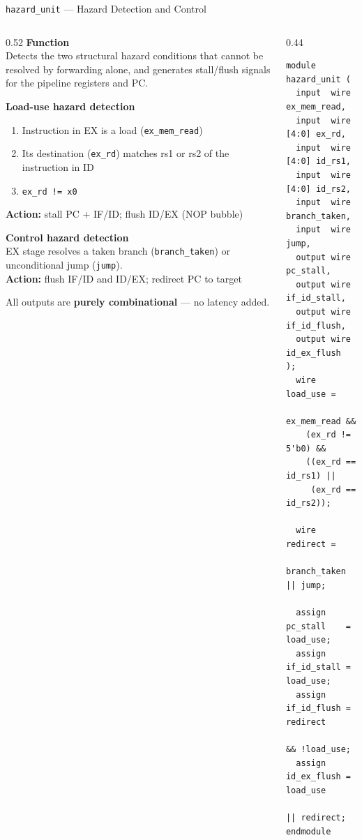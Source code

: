 \documentclass[aspectratio=169,10pt]{beamer}
\begin{document}
\begin{frame}[fragile]{\texttt{hazard\_unit} --- Hazard Detection and Control}
  \begin{columns}[T]
    \begin{column}{0.52\textwidth}
      \textbf{Function}\\
      Detects the two structural hazard conditions that cannot be resolved by forwarding alone, and generates stall/flush signals for the pipeline registers and PC.

      \vspace{0.5em}
      \textbf{Load-use hazard detection}
      \begin{enumerate}\small
        \item Instruction in EX is a load (\texttt{ex\_mem\_read})
        \item Its destination (\texttt{ex\_rd}) matches rs1 or rs2 of the instruction in ID
        \item \texttt{ex\_rd != x0}
      \end{enumerate}
      \textbf{Action:} stall PC + IF/ID; flush ID/EX (NOP bubble)

      \vspace{0.5em}
      \textbf{Control hazard detection}\\
      EX stage resolves a taken branch (\texttt{branch\_taken}) or unconditional jump (\texttt{jump}).\\
      \textbf{Action:} flush IF/ID and ID/EX; redirect PC to target

      \vspace{0.5em}
      \small All outputs are \textbf{purely combinational} --- no latency added.
    \end{column}
    \begin{column}{0.44\textwidth}
\begin{lstlisting}
module hazard_unit (
  input  wire       ex_mem_read,
  input  wire [4:0] ex_rd,
  input  wire [4:0] id_rs1,
  input  wire [4:0] id_rs2,
  input  wire       branch_taken,
  input  wire       jump,
  output wire       pc_stall,
  output wire       if_id_stall,
  output wire       if_id_flush,
  output wire       id_ex_flush
);
  wire load_use =
    ex_mem_read &&
    (ex_rd != 5'b0) &&
    ((ex_rd == id_rs1) ||
     (ex_rd == id_rs2));

  wire redirect =
    branch_taken || jump;

  assign pc_stall    = load_use;
  assign if_id_stall = load_use;
  assign if_id_flush = redirect
                       && !load_use;
  assign id_ex_flush = load_use
                       || redirect;
endmodule
\end{lstlisting}
    \end{column}
  \end{columns}
\end{frame}
\end{document}

